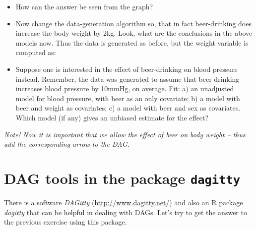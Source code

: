 \documentclass[
]{book}
\newenvironment{Shaded}{\begin{snugshade}}{\end{snugshade}}
\newcommand{\DecValTok}[1]{\textcolor[rgb]{0.00,0.00,0.81}{#1}}
\newcommand{\FunctionTok}[1]{\textcolor[rgb]{0.13,0.29,0.53}{\textbf{#1}}}
\newcommand{\NormalTok}[1]{#1}
\newcommand{\OtherTok}[1]{\textcolor[rgb]{0.56,0.35,0.01}{#1}}
\newcommand{\SpecialCharTok}[1]{\textcolor[rgb]{0.81,0.36,0.00}{\textbf{#1}}}
\providecommand{\tightlist}{%
  \setlength{\itemsep}{0pt}\setlength{\parskip}{0pt}}
\begin{document}
\begin{itemize}
\item
  How can the answer be seen from the graph?
\item
  Now change the data-generation algorithm so, that in fact beer-drinking does increase the body weight by 2kg. Look, what are the conclusions in the above models now. Thus the data is generated as before, but the weight variable is computed as:
\end{itemize}

\begin{Shaded}
\end{Shaded}

\begin{itemize}
\tightlist
\item
  Suppose one is interested in the effect of beer-drinking on blood pressure instead. Remember, the data was generated to assume that beer drinking increases blood pressure by 10mmHg, on average. Fit: a) an unadjusted model for blood pressure, with beer as an only covariate; b) a model with beer and weight as covariates; c) a model with beer and sex as covariates. Which model (if any) gives an unbiased estimate for the effect?
\end{itemize}

\emph{Note! Now it is important that we allow the effect of beer on body weight -- thus add the corresponding arrow to the DAG.}

\section{\texorpdfstring{DAG tools in the package \texttt{dagitty}}{DAG tools in the package dagitty}}\label{dag-tools-in-the-package-dagitty}

There is a software \emph{DAGitty} (\url{http://www.dagitty.net/}) and also an R package \emph{dagitty} that can be helpful in dealing with DAGs. Let's try to get the answer to the previous exercise using this package.
\end{document}
